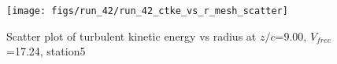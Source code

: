 \begin{figure}[H]
\centering
\texttt{[image: figs/run\_42/run\_42\_ctke\_vs\_r\_mesh\_scatter]}
\caption{Scatter plot of turbulent kinetic energy vs radius at $z/c$=9.00, $V_{free}$=17.24, station5}
\label{fig:run_42_ctke_vs_r_mesh_scatter}
\end{figure}


